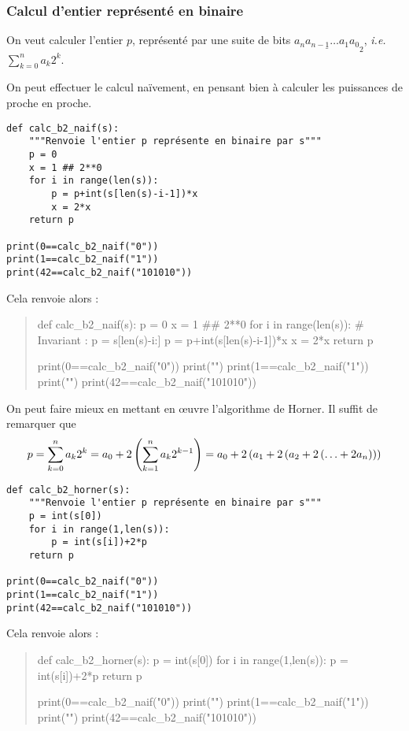 \subsubsection{Calcul d'entier représenté en binaire}

On veut calculer l'entier $p$, représenté par une suite de bits
$\underline{a_{n}a_{n-1}\ldots a_{1}a_{0}}_{2}$, \emph{i.e.}
$\displaystyle\sum_{k=0}^{n}a_{k}2^{k}$.

On peut effectuer le calcul naïvement, en pensant bien à calculer les puissances de proche en proche. 

\begin{lstlisting}
def calc_b2_naif(s):
    """Renvoie l'entier p représente en binaire par s"""
    p = 0
    x = 1 ## 2**0
    for i in range(len(s)):
        p = p+int(s[len(s)-i-1])*x
        x = 2*x
    return p

print(0==calc_b2_naif("0"))
print(1==calc_b2_naif("1"))
print(42==calc_b2_naif("101010"))
\end{lstlisting}


Cela renvoie alors :
\begin{quote}
\begin{pycode}
def calc_b2_naif(s):
    p = 0
    x = 1 ## 2**0
    for i in range(len(s)):
        # Invariant : p = s[len(s)-i:]
        p = p+int(s[len(s)-i-1])*x
        x = 2*x
    return p

print(0==calc_b2_naif("0"))
print("\n")
print(1==calc_b2_naif("1"))
print("\n")
print(42==calc_b2_naif("101010"))
\end{pycode}
\end{quote}

On peut faire mieux en mettant en {\oe}uvre l'algorithme de Horner. Il suffit de remarquer que 
\begin{equation*}
  p = \sum_{k=0}^{n}a_{k}2^{k} = a_0 + 2\left( \sum_{k=1}^{n}a_{k}2^{k-1}\right) = a_0 + 2\left( a_1+2\left( a_2 + 2\left( \ldots + 2a_n\right)\right)\right)
\end{equation*}

\begin{lstlisting}
def calc_b2_horner(s):
    """Renvoie l'entier p représente en binaire par s"""
    p = int(s[0])
    for i in range(1,len(s)):
        p = int(s[i])+2*p
    return p
    
print(0==calc_b2_naif("0"))
print(1==calc_b2_naif("1"))
print(42==calc_b2_naif("101010"))
\end{lstlisting}


Cela renvoie alors :
\begin{quote}
\begin{pycode}
def calc_b2_horner(s):
    p = int(s[0])
    for i in range(1,len(s)):
        p = int(s[i])+2*p
    return p
    
print(0==calc_b2_naif("0"))
print("\n")
print(1==calc_b2_naif("1"))
print("\n")
print(42==calc_b2_naif("101010"))
\end{pycode}
\end{quote}

